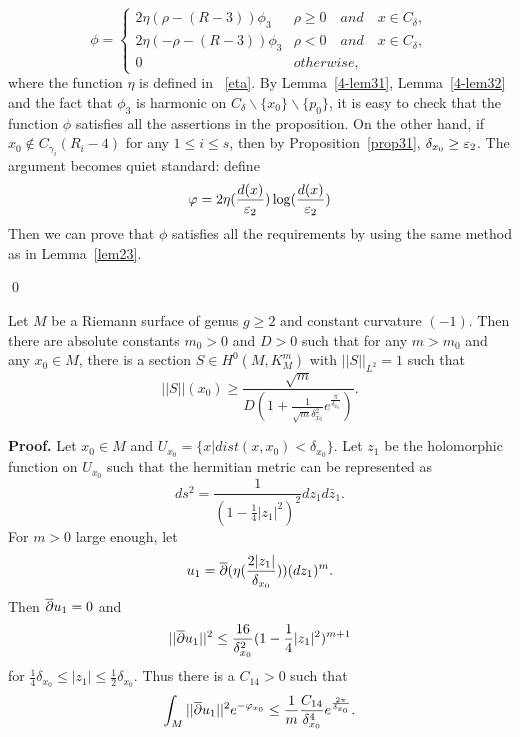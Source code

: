 \begin{equation}\label{defphi1}
\phi=\left\{
\begin{array}{ll}
2\eta(\rho-(R-3))\phi_3 & \rho\geq 0\quad and\quad x\in C_\delta,\\
2\eta(-\rho-(R-3))\phi_3 & \rho<0\quad and\quad x\in C_\delta,\\
0 & otherwise,
\end{array}
\right.
\end{equation}
where the function $\eta$ is defined in ~\eqref{eta}.
By Lemma~\ref{4-lem31}, Lemma~\ref{4-lem32} and the fact that
$\phi_3$ is harmonic on $C_\delta\backslash\{x_0\}\backslash\{p_0\}$,
it is easy to check that the function $\phi$ satisfies all the  
assertions in the proposition. On the other hand, if $x_0\notin
C_{\gamma_i}(R_i-4)$ for any
$1\leq i\leq s$, then by Proposition~\ref{prop31}, $\delta_{x_0}\geq
\varepsilon_2$. The argument becomes quiet standard: define
\begin{equation}\label{defphi2}
\varphi=2\eta(\frac{d(x)}{\varepsilon_2})\log(\frac{d(x)}{\varepsilon_2})
\end{equation}
Then we can prove that $\phi$ satisfies all the requirements by using the
same
method as in
Lemma~\ref{lem23}.

\qed

\begin{theorem}
Let $M$ be a Riemann surface of genus $g\geq 2$ and constant curvature
$(-1)$. Then there are absolute constants $m_0>0$ and $D>0$ such that for
any $m>m_0$
and any $x_0\in M$, there is a section $S\in H^0(M,K_M^m)$ with
$||S||_{L^2}=1$ such that
\begin{equation}
||S||(x_0)\geq\frac{\sqrt m}{D(1+\frac{1}{\sqrt m\delta_{x_0}^2}
e^{\frac{\pi}{\delta_{x_0}}})}.
\end{equation}
\end{theorem}

{\bf Proof.}
Let $x_0\in M$ and $U_{x_0}=\{x| dist(x,x_0)<\delta_{x_0}\}$. Let $z_1$ be
the holomorphic function  on $U_{x_0}$ such that the hermitian metric
can be represented as
\[
ds^2=\frac{1}{(1-\frac 14|z_1|^2)^2}dz_1 d\bar z_1.
\]
For $m>0$ large enough, let
\[
u_1=\overline{\partial}(\eta(\frac{2|z_1|}{\delta_{x_0}}))(dz_1)^m.
\]
Then $\overline {\partial} u_1=0$ and 
\[
||\overline{\partial}
u_1||^2\leq\frac{16}{\delta^2_{x_0}}
(1-\frac 14|z_1|^2)^{m+1}
\]
for $\frac 14\delta_{x_0}\leq|z_1|\leq\frac 12\delta_{x_0}$.
Thus
there is a $C_{14}>0$ such that
\[
\int_M||\overline{\partial} u_1||^2 e^{-\varphi_{x_0}}\leq
\frac 1m\frac{C_{14}}{\delta^4_{x_0}} e^{\frac{2\pi}{\delta_{x_0}}}.
\]

